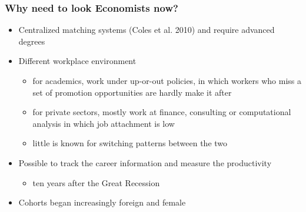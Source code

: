 \documentclass[11pt]{beamer}
\begin{document}
\begin{frame}
	\frametitle{Why need to look Economists now?}
	\begin{itemize}
		
							    \item Centralized matching systems (Coles et al. 2010) and require advanced degrees
							    \item Different workplace environment
							    \begin{itemize}
							    	\item for academics, work under up-or-out policies, in which workers who miss a set of promotion opportunities are hardly make it after
							    	\item for private sectors, mostly work at finance, consulting or computational analysis in which job attachment is low 
							 	    \item little is known for switching patterns between the two    
						     \end{itemize}
			   				    \item Possible to track the career information and measure the productivity
			   				    \begin{itemize}
			   				    	\item ten years after the Great Recession
			   				    \end{itemize} 
			   				    \item Cohorts began increasingly foreign and female 
		
	\end{itemize}
\end{frame}
\end{document}

